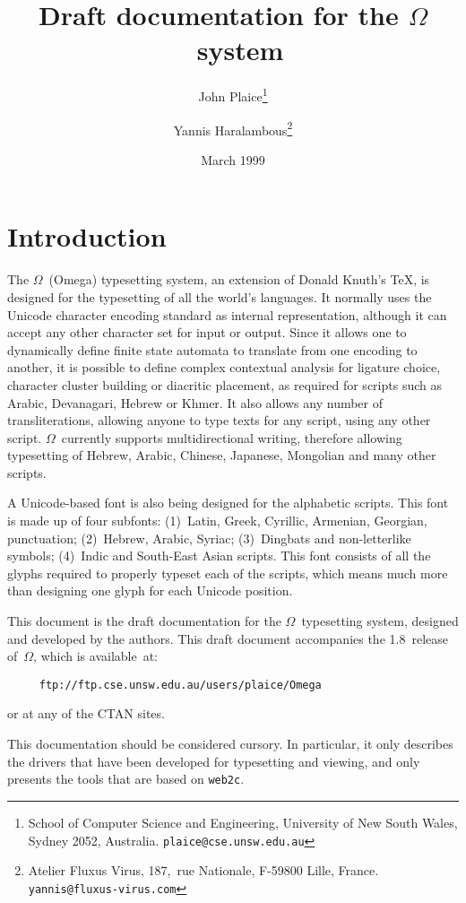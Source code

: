 \documentclass[fleqn]{article}
\newcommand{\OMEGA}{$\Omega$}
\begin{document}
\title{Draft documentation for the \OMEGA\ system}
\author{John Plaice\thanks{School of Computer Science
and Engineering, University of New South Wales,
Sydney 2052, Australia.  \texttt{plaice@cse.unsw.edu.au}}
\and Yannis  Haralambous\thanks{Atelier Fluxus Virus,
187,~rue Nationale, F-59800 Lille, France.
\texttt{yannis@fluxus-virus.com}}}
\date{March 1999}
\maketitle

\section{Introduction}
The \OMEGA\ (Omega) typesetting system, an extension of Donald Knuth's \TeX,
is designed for the typesetting of all the world's languages.  It
normally uses the Unicode character encoding standard
as internal representation, although it can
accept any other character set for input or output.  Since it allows
one to dynamically define finite state automata to translate from
one encoding to another, it is possible to define complex contextual
analysis for ligature choice, character cluster building or diacritic
placement, as required for scripts such as Arabic, Devanagari,
Hebrew or Khmer.  It also allows any number of transliterations,
allowing anyone to type texts for any script, using any other script.
\OMEGA\ currently supports multidirectional writing, therefore
allowing typesetting of Hebrew, Arabic, Chinese, Japanese, Mongolian
and many other scripts.

A Unicode-based font is also being designed for the alphabetic
scripts.  This font is made up of four subfonts: (1)~Latin, Greek,
Cyrillic, Armenian, Georgian, punctuation; (2)~Hebrew, Arabic, Syriac;
(3)~Dingbats and non-letterlike symbols; (4)~Indic and South-East
Asian scripts.  This font consists of all the glyphs required to
properly typeset each of the scripts, which means much more than
designing one glyph for each Unicode position.

This document is the draft documentation for the \OMEGA\ typesetting
system, designed and developed by the authors.  This draft document
accompanies the 1.8~release of~\OMEGA, which is available~at:
\begin{verbatim}
     ftp://ftp.cse.unsw.edu.au/users/plaice/Omega
\end{verbatim}
or at any of the CTAN sites.

This documentation should be considered cursory.
In particular, it only describes the drivers that
have been developed for typesetting and viewing,
and only presents the tools that are
based on \texttt{web2c}.
\end{document}
